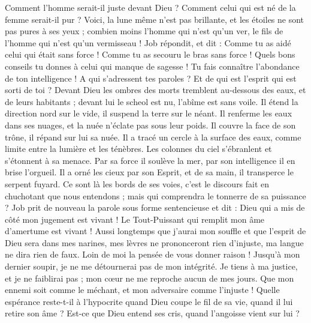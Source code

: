 \begin{multicols}{2}
Comment l'homme serait-il juste devant Dieu ? Comment celui qui est né de la femme serait-il pur ?
Voici, la lune même n'est pas brillante, et les étoiles ne sont pas pures à ses yeux ;
combien moins l'homme qui n'est qu'un ver, le fils de l'homme qui n'est qu'un vermisseau !
\VerseOne{}Job répondit, et dit :
Comme tu as aidé celui qui était sans force ! Comme tu as secouru le bras sans force !
Quels bons conseils tu donnes à celui qui manque de sagesse ! Tu fais connaître l'abondance de ton intelligence !
A qui s'adressent tes paroles ? Et de qui est l'esprit qui est sorti de toi ?
Devant Dieu les ombres des morts tremblent au-dessous des eaux, et de leurs habitants ;
devant lui le scheol est nu, l'abîme est sans voile.
Il étend la direction nord sur le vide, il suspend la terre sur le néant.
Il renferme les eaux dans ses nuages, et la nuée n'éclate pas sous leur poids.
Il couvre la face de son trône, il répand sur lui sa nuée.
Il a tracé un cercle à la surface des eaux, comme limite entre la lumière et les ténèbres.
Les colonnes du ciel s'ébranlent et s'étonnent à sa menace.
Par sa force il soulève la mer, par son intelligence il en brise l'orgueil.
Il a orné les cieux par son Esprit, et  de sa main, il transperce le serpent fuyard.
Ce sont là les bords de ses voies, c'est le discours fait en chuchotant que nous entendons ; mais qui comprendra le tonnerre de sa puissance ?
\VerseOne{}Job prit de nouveau la parole sous forme sentencieuse et dit :
Dieu qui a mis de côté mon jugement est vivant ! Le Tout-Puissant qui remplit mon âme d'amertume est vivant !
Aussi longtemps que j'aurai mon souffle et que l'esprit de Dieu sera dans mes narines,
mes lèvres ne prononceront rien d'injuste, ma langue ne dira rien de faux.
Loin de moi la pensée de vous donner raison ! Jusqu'à mon dernier soupir, je ne me détournerai pas de mon intégrité.
Je tiens à ma justice, et je ne faiblirai pas ; mon cœur ne me reproche aucun de mes jours.
Que mon ennemi soit comme le méchant, et mon adversaire comme l'injuste !
Quelle espérance reste-t-il à l'hypocrite quand Dieu coupe le fil de sa vie, quand il lui retire son âme ?
Est-ce que Dieu entend ses cris, quand l'angoisse vient sur lui ?

\end{multicols}
